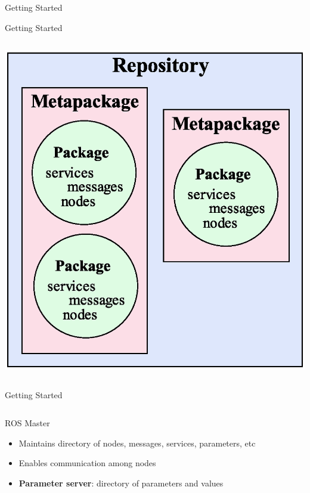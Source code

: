 \documentclass[9pt]{beamer}
\begin{document}
\begin{section}{Getting Started}
\begin{frame}{Getting Started}
\begin{columns}
\begin{column}{0.5\textwidth}
\begin{center}
                    \includegraphics[width=\textwidth,trim={0cm 0cm 0cm 0cm},clip]{img/ros_repos.eps}
                \end{center}           
            \end{column}        
        \end{columns}
    \end{frame}
    \begin{frame}{Getting Started} \label{frame:master}
        \begin{columns}
            \begin{column}{0.5\textwidth}
                \begin{block}{ROS Master}
                    \begin{itemize}
                        \item Maintains directory of nodes, messages, services, parameters, etc
                        \item Enables communication among nodes
                        \item \textbf{Parameter server}: directory of parameters and values
                    \end{itemize}
                \end{block}
            \end{column}

\end{columns}
\end{frame}
\end{section}
\end{document}
